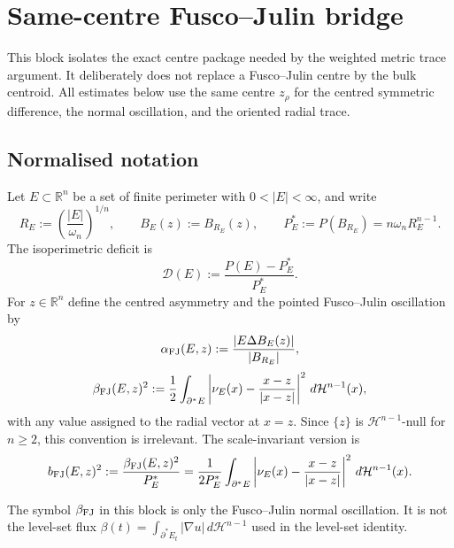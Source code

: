 %

\providecommand{\R}{\mathbb{R}}
\providecommand{\rstar}{\rho_*}
\providecommand{\Hn}{\mathcal H^{n-1}}

\section{Same-centre Fusco--Julin bridge}
\label{sec:fjbridge}

This block isolates the exact centre package needed by the weighted
metric trace argument.  It deliberately does not replace a
Fusco--Julin centre by the bulk centroid.  All estimates below use the
same centre \(z_\rho\) for the centred symmetric difference, the normal
oscillation, and the oriented radial trace.

\subsection{Normalised notation}
\label{ssec:fjbridge-notation}

Let \(E\subset\R^n\) be a set of finite perimeter with
\(0<|E|<\infty\), and write
\[
   R_E:=\left(\frac{|E|}{\omega_n}\right)^{1/n},
   \qquad B_E(z):=B_{R_E}(z),
   \qquad P_E^*:=P(B_{R_E})=n\omega_n R_E^{n-1}.
\]
The isoperimetric deficit is
\[
   \mathcal D(E):=\frac{P(E)-P_E^*}{P_E^*}.
\]
For \(z\in\R^n\) define the centred asymmetry and the pointed
Fusco--Julin oscillation by
\[
   \alpha_{\rm FJ}(E,z)
   :=\frac{|E\Delta B_E(z)|}{|B_{R_E}|},
\]
\[
   \beta_{\rm FJ}(E,z)^2
   :=\frac12\int_{\partial^*E}
      \left|\nu_E(x)-\frac{x-z}{|x-z|}\right|^2\,d\Hn(x),
\]
with any value assigned to the radial vector at \(x=z\).  Since
\(\{z\}\) is \(\Hn\)-null for \(n\ge2\), this convention is irrelevant.
The scale-invariant version is
\[
   b_{\rm FJ}(E,z)^2:=\frac{\beta_{\rm FJ}(E,z)^2}{P_E^*}
   =\frac{1}{2P_E^*}\int_{\partial^*E}
      \left|\nu_E(x)-\frac{x-z}{|x-z|}\right|^2\,d\Hn(x).
\]

\begin{remark}
The symbol \(\beta_{\rm FJ}\) in this block is only the
Fusco--Julin normal oscillation.  It is not the level-set flux
\(\beta(t)=\int_{\partial^*E_t}|\nabla u|\,d\Hn\) used in the
level-set identity.
\end{remark}

